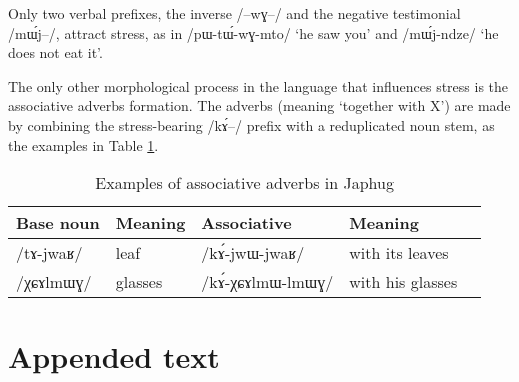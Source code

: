 \documentclass[oldfontcommands,oneside,a4paper,11pt]{article}
\newcommand{\ipa}[1]{/#1/} %
\begin{document}
Only two verbal prefixes, the inverse \ipa{--wɣ--} and the negative testimonial \ipa{mɯ́j--}, attract stress, as in \ipa{pɯ-tɯ́-wɣ-mto} `he saw you' and \ipa{mɯ́j-ndze} `he does not eat it'.
         
The only other morphological process in the language that influences stress is the  associative adverbs formation. The adverbs (meaning `together with X') are made by combining the stress-bearing \ipa{kɤ́--}  prefix with a reduplicated noun stem, as the examples in Table \ref{tab:assoc.adv}.

\begin{table}
 \caption{Examples of associative adverbs in Japhug} \label{tab:assoc.adv}  \centering
\begin{tabular}{lllll}
\toprule
Base noun & Meaning & Associative & Meaning \\
\midrule
\ipa{tɤ-jwaʁ} & leaf & \ipa{kɤ́-jwɯ-jwaʁ} & with its leaves\\
\ipa{χɕɤlmɯɣ} & glasses & \ipa{kɤ́-χɕɤlmɯ-lmɯɣ} & with his glasses\\
\bottomrule
\end{tabular}
\end{table}
         
         
     \section{Appended text}


\end{document}
